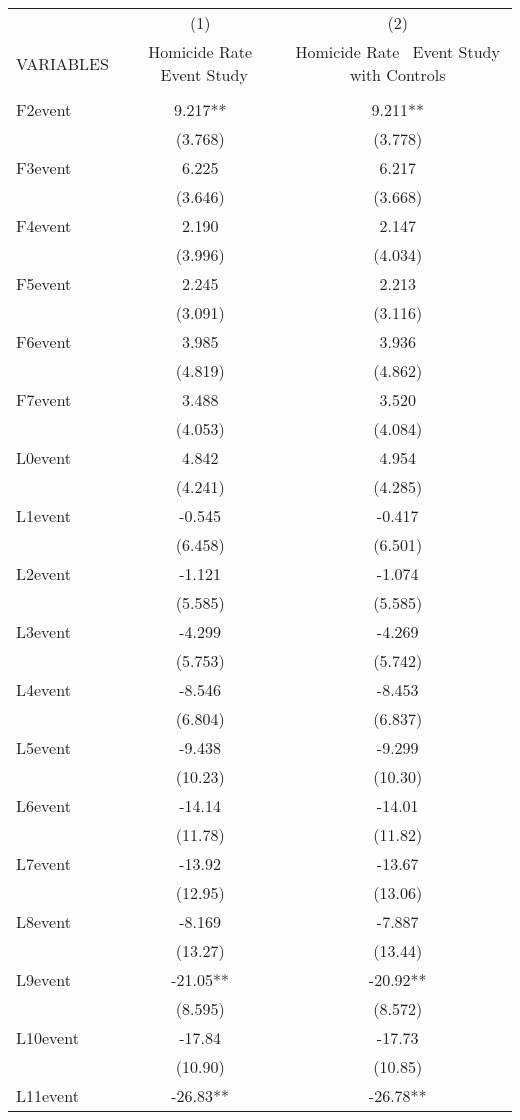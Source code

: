 \documentclass[]{article}
\begin{document}
\begin{tabular}{lcc} \hline
 & (1) & (2) \\
VARIABLES & Homicide Rate \ Event Study & Homicide Rate \ Event Study with Controls \\ \hline
 &  &  \\
F2event & 9.217** & 9.211** \\
 & (3.768) & (3.778) \\
F3event & 6.225 & 6.217 \\
 & (3.646) & (3.668) \\
F4event & 2.190 & 2.147 \\
 & (3.996) & (4.034) \\
F5event & 2.245 & 2.213 \\
 & (3.091) & (3.116) \\
F6event & 3.985 & 3.936 \\
 & (4.819) & (4.862) \\
F7event & 3.488 & 3.520 \\
 & (4.053) & (4.084) \\
L0event & 4.842 & 4.954 \\
 & (4.241) & (4.285) \\
L1event & -0.545 & -0.417 \\
 & (6.458) & (6.501) \\
L2event & -1.121 & -1.074 \\
 & (5.585) & (5.585) \\
L3event & -4.299 & -4.269 \\
 & (5.753) & (5.742) \\
L4event & -8.546 & -8.453 \\
 & (6.804) & (6.837) \\
L5event & -9.438 & -9.299 \\
 & (10.23) & (10.30) \\
L6event & -14.14 & -14.01 \\
 & (11.78) & (11.82) \\
L7event & -13.92 & -13.67 \\
 & (12.95) & (13.06) \\
L8event & -8.169 & -7.887 \\
 & (13.27) & (13.44) \\
L9event & -21.05** & -20.92** \\
 & (8.595) & (8.572) \\
L10event & -17.84 & -17.73 \\
 & (10.90) & (10.85) \\
L11event & -26.83** & -26.78** \\

\end{tabular}
\end{document}
